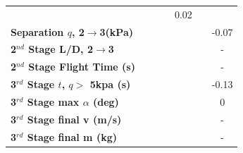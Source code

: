 \begin{table}[ht]
\begin{tabular}{l c c c c c c}
		& \secondthirdSeparationgammaCdThreeStandardNoReturn
		& \secondthirdSeparationgammaCdThreeOneHundredTenNoReturn
		& \secondthirdSeparationgammaCdThreeOneHundredTwentyNoReturn
		&0.02
		\\
		\textbf{Separation $q$, 2$\rightarrow$3(kPa)}
		& \secondthirdSeparationqCdThreeEightyNoReturn
		& \secondthirdSeparationqCdThreeNinetyNoReturn
		& \secondthirdSeparationqCdThreeStandardNoReturn
		& \secondthirdSeparationqCdThreeOneHundredTenNoReturn
		& \secondthirdSeparationqCdThreeOneHundredTwentyNoReturn
		&-0.07
		\\
		\textbf{2$^{nd}$ Stage L/D, 2$\rightarrow$3}
		& \secondthirdSeparationLDCdThreeEightyNoReturn
		& \secondthirdSeparationLDCdThreeNinetyNoReturn
		& \secondthirdSeparationLDCdThreeStandardNoReturn
		& \secondthirdSeparationLDCdThreeOneHundredTenNoReturn
		& \secondthirdSeparationLDCdThreeOneHundredTwentyNoReturn
		& -
		\\
		\textbf{2$^{nd}$ Stage Flight Time (s)}
		& \secondFlightTimeCdThreeEightyNoReturn
		& \secondFlightTimeCdThreeNinetyNoReturn
		& \secondFlightTimeCdThreeStandardNoReturn
		& \secondFlightTimeCdThreeOneHundredTenNoReturn
		& \secondFlightTimeCdThreeOneHundredTwentyNoReturn
		& -
		\\
		\textbf{3$^{rd}$ Stage $t$, $q >$ 5kpa (s)}
		& \thirdqOverFiveCdThreeEightyNoReturn
		& \thirdqOverFiveCdThreeNinetyNoReturn
		& \thirdqOverFiveCdThreeStandardNoReturn
		& \thirdqOverFiveCdThreeOneHundredTenNoReturn
		& \thirdqOverFiveCdThreeOneHundredTwentyNoReturn
		&-0.13
		\\
		\textbf{3$^{rd}$ Stage max $\alpha$ (deg)}
		& \thirdmaxAoACdThreeEightyNoReturn
		& \thirdmaxAoACdThreeNinetyNoReturn
		& \thirdmaxAoACdThreeStandardNoReturn
		& \thirdmaxAoACdThreeOneHundredTenNoReturn
		& \thirdmaxAoACdThreeOneHundredTwentyNoReturn
		&0
		\\
		\textbf{3$^{rd}$ Stage final v (m/s)}
		& \thirdcircvCdThreeEightyNoReturn
		& \thirdcircvCdThreeNinetyNoReturn
		& \thirdcircvCdThreeStandardNoReturn
		& \thirdcircvCdThreeOneHundredTenNoReturn
		& \thirdcircvCdThreeOneHundredTwentyNoReturn
		& -
		\\
		\textbf{3$^{rd}$ Stage final m (kg)}
		& \thirdcircmCdThreeEightyNoReturn
		& \thirdcircmCdThreeNinetyNoReturn
		& \thirdcircmCdThreeStandardNoReturn
		& \thirdcircmCdThreeOneHundredTenNoReturn
		& \thirdcircmCdThreeOneHundredTwentyNoReturn
		& -
		\\
		\hline 
	\end{tabular} 
	
\end{table}

